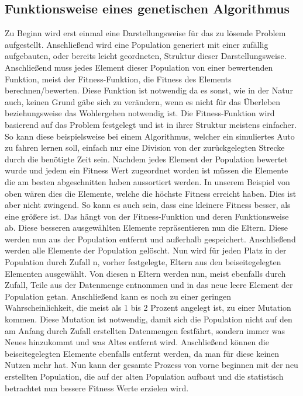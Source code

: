 \documentclass[a4paper,12pt]{article}
\begin{document}
\subsection{Funktionsweise eines genetischen Algorithmus}
Zu Beginn wird erst einmal eine Darstellungsweise für das zu lösende Problem aufgestellt. Anschließend wird eine Population generiert mit einer zufällig aufgebauten, oder bereits leicht geordneten, Struktur dieser Darstellungsweise. Anschließend muss jedes Element dieser Population von einer bewertenden Funktion, meist der Fitness-Funktion, die Fitness des Elements berechnen/bewerten. Diese Funktion ist notwendig da es sonst, wie in der Natur auch, keinen Grund gäbe sich zu verändern, wenn es nicht für das Überleben beziehungsweise das Wohlergehen notwendig ist. Die Fitness-Funktion wird basierend auf das Problem festgelegt und ist in ihrer Struktur meistens einfacher. So kann diese beispielsweise bei einem Algorithmus, welcher ein simuliertes Auto zu fahren lernen soll, einfach nur eine Division von der zurückgelegten Strecke durch die benötigte Zeit sein. 
Nachdem jedes Element der Population bewertet wurde und jedem ein Fitness Wert zugeordnet worden ist müssen die Elemente die am besten abgeschnitten haben aussortiert werden. In unserem Beispiel von oben wären dies die Elemente, welche die höchste Fitness erreicht haben. Dies ist aber nicht zwingend. So kann es auch sein, dass eine kleinere Fitness besser, als eine größere ist. Das hängt von der Fitness-Funktion und deren Funktionsweise ab. 
Diese besseren ausgewählten Elemente repräsentieren nun die Eltern. Diese werden nun aus der Population entfernt und außerhalb gespeichert. Anschließend werden alle Elemente der Population gelöscht. Nun wird für jeden Platz in der Population durch Zufall n, vorher festgelegte, Eltern aus den beiseitegelegten Elementen ausgewählt. Von diesen n Eltern werden nun, meist ebenfalls durch Zufall, Teile aus der Datenmenge entnommen und in das neue leere Element der Population getan. Anschließend kann es noch zu einer geringen Wahrscheinlichkeit, die meist als 1 bis 2 Prozent angelegt ist, zu einer Mutation kommen. Diese Mutation ist notwendig, damit sich die Population nicht auf den am Anfang durch Zufall erstellten Datenmengen festfährt, sondern immer was Neues hinzukommt und was Altes entfernt wird. Anschließend können die beiseitegelegten Elemente ebenfalls entfernt werden, da man für diese keinen Nutzen mehr hat. Nun kann der gesamte Prozess von vorne beginnen mit der neu erstellten Population, die auf der alten Population aufbaut und die statistisch betrachtet nun bessere Fitness Werte erzielen wird. 
\end{document}
